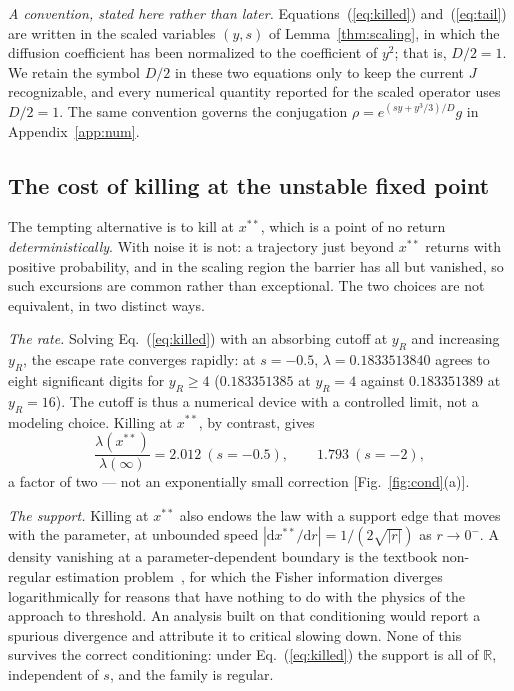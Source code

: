 \documentclass[%
 aip,
 cha,
 amsmath,amssymb,
 reprint,
 superscriptaddress,
 floatfix,
]{revtex4-2}
\newcommand{\dd}{\mathrm{d}}
\begin{document}
\emph{A convention, stated here rather than later.}  Equations~(\ref{eq:killed}) and~(\ref{eq:tail}) are written in the scaled variables $(y,s)$ of Lemma~\ref{thm:scaling}, in which the diffusion coefficient has been normalized to the coefficient of $y^2$; that is, $D/2=1$.  We retain the symbol $D/2$ in these two equations only to keep the current $J$ recognizable, and every numerical quantity reported for the scaled operator uses $D/2=1$.  The same convention governs the conjugation $\rho=e^{(sy+y^3/3)/D}g$ in Appendix~\ref{app:num}.

\subsection{The cost of killing at the unstable fixed point}

The tempting alternative is to kill at $x^{\ast\ast}$, which is a point of no return \emph{deterministically}.  With noise it is not: a trajectory just beyond $x^{\ast\ast}$ returns with positive probability, and in the scaling region the barrier has all but vanished, so such excursions are common rather than exceptional.  The two choices are not equivalent, in two distinct ways.

\emph{The rate.}  Solving Eq.~(\ref{eq:killed}) with an absorbing cutoff at $y_R$ and increasing $y_R$, the escape rate converges rapidly: at $s=-0.5$, $\lambda=0.1833513840$ agrees to eight significant digits for $y_R\ge4$ ($0.183351385$ at $y_R=4$ against $0.183351389$ at $y_R=16$).  The cutoff is thus a numerical device with a controlled limit, not a modeling choice.  Killing at $x^{\ast\ast}$, by contrast, gives
\begin{equation}
\label{eq:xssratio}
\frac{\lambda(x^{\ast\ast})}{\lambda(\infty)}=2.012\ (s=-0.5),\qquad 1.793\ (s=-2),
\end{equation}
a factor of two --- not an exponentially small correction [Fig.~\ref{fig:cond}(a)].

\emph{The support.}  Killing at $x^{\ast\ast}$ also endows the law with a support edge that moves with the parameter, at unbounded speed $|\dd x^{\ast\ast}/\dd r|=1/(2\sqrt{|r|})$ as $r\to0^-$.  A density vanishing at a parameter-dependent boundary is the textbook non-regular estimation problem~\cite{IbragimovHasminskii,AkahiraTakeuchi}, for which the Fisher information diverges logarithmically for reasons that have nothing to do with the physics of the approach to threshold.  An analysis built on that conditioning would report a spurious divergence and attribute it to critical slowing down.  None of this survives the correct conditioning: under Eq.~(\ref{eq:killed}) the support is all of $\mathbb{R}$, independent of $s$, and the family is regular.
\end{document}
